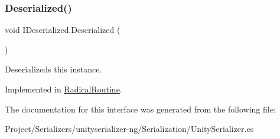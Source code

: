 \subsubsection{\texorpdfstring{Deserialized()}{Deserialized()}}
{\footnotesize\ttfamily void I\+Deserialized.\+Deserialized (\begin{DoxyParamCaption}{ }\end{DoxyParamCaption})}



Deserializeds this instance. 



Implemented in \hyperlink{class_radical_routine_a4e2d17f21fc9df7ef8bb06ba3a22e9e0}{Radical\+Routine}.



The documentation for this interface was generated from the following file\+:\begin{DoxyCompactItemize}
\item 
Project/\+Serializers/unityserializer-\/ng/\+Serialization/Unity\+Serializer.\+cs\end{DoxyCompactItemize}
